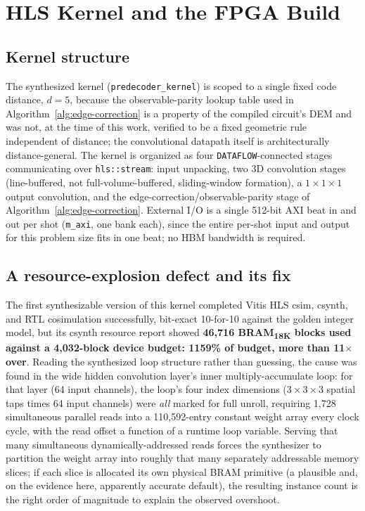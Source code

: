 \documentclass[conference]{IEEEtran}
\begin{document}
\section{HLS Kernel and the FPGA Build}
\label{sec:hls}

\subsection{Kernel structure}
The synthesized kernel (\texttt{predecoder\_kernel}) is scoped to a single fixed code distance, \(d=5\), because the observable-parity lookup table used in Algorithm~\ref{alg:edge-correction} is a property of the compiled circuit's DEM and was not, at the time of this work, verified to be a fixed geometric rule independent of distance; the convolutional datapath itself is architecturally distance-general. The kernel is organized as four \texttt{DATAFLOW}-connected stages communicating over \texttt{hls::stream}: input unpacking, two 3D convolution stages (line-buffered, not full-volume-buffered, sliding-window formation), a \(1\times1\times1\) output convolution, and the edge-correction/observable-parity stage of Algorithm~\ref{alg:edge-correction}. External I/O is a single 512-bit AXI beat in and out per shot (\texttt{m\_axi}, one bank each), since the entire per-shot input and output for this problem size fits in one beat; no HBM bandwidth is required.

\subsection{A resource-explosion defect and its fix}
\label{subsec:results-hls}

The first synthesizable version of this kernel completed Vitis HLS csim, csynth, and RTL cosimulation successfully, bit-exact 10-for-10 against the golden integer model, but its csynth resource report showed \textbf{46{,}716 BRAM\textsubscript{18K} blocks used against a 4{,}032-block device budget: 1159\% of budget, more than 11\(\times\) over}. Reading the synthesized loop structure rather than guessing, the cause was found in the wide hidden convolution layer's inner multiply-accumulate loop: for that layer (64 input channels), the loop's four index dimensions (\(3\times3\times3\) spatial taps times 64 input channels) were \emph{all} marked for full unroll, requiring 1{,}728 simultaneous parallel reads into a 110{,}592-entry constant weight array every clock cycle, with the read offset a function of a runtime loop variable. Serving that many simultaneous dynamically-addressed reads forces the synthesizer to partition the weight array into roughly that many separately addressable memory slices; if each slice is allocated its own physical BRAM primitive (a plausible and, on the evidence here, apparently accurate default), the resulting instance count is the right order of magnitude to explain the observed overshoot.
\end{document}
